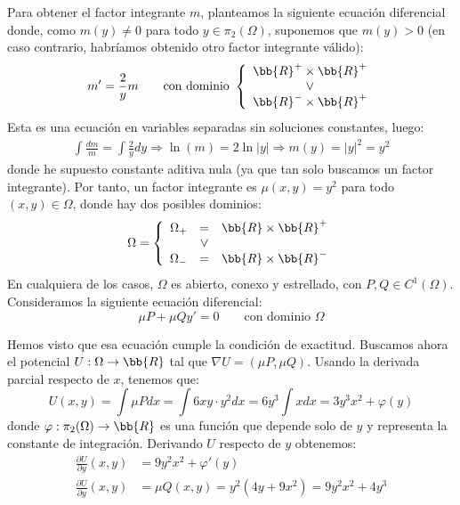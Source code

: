 \begin{ejercicio}
\begin{enumerate}
        Para obtener el factor integrante $m$, planteamos la siguiente ecuación diferencial donde, como $m(y)\neq 0$ para todo $y\in\pi_2(\Omega)$, suponemos que $m(y)>0$ (en caso contrario, habríamos obtenido otro factor integrante válido):
        \begin{equation*}
            m'=\frac{2}{y}m \qquad \text{con dominio }\left\{
                \begin{array}{c}
                    \bb{R}^+\times \bb{R}^+\\
                    \lor\\
                    \bb{R}^-\times \bb{R}^+
                \end{array}
            \right.
        \end{equation*}
        Esta es una ecuación en variables separadas sin soluciones constantes, luego:
        \begin{align*}
            \int \frac{dm}{m} = \int \frac{2}{y}dy
            \Longrightarrow \ln (m) = 2\ln |y|
            \Longrightarrow m(y) = |y|^2 = y^2
        \end{align*}
        donde he supuesto constante aditiva nula (ya que tan solo buscamos un factor integrante). Por tanto, un factor integrante es $\mu(x,y)=y^2$ para todo $(x,y)\in\Omega$, donde hay dos posibles dominios:
        \begin{equation*}
            \Omega=\left\{
                \begin{array}{rcl}
                    \Omega_+ &=& \bb{R} \times \bb{R}^+\\
                    &\lor&\\
                    \Omega_- &=& \bb{R} \times \bb{R}^-
                \end{array}
            \right.
        \end{equation*}
        En cualquiera de los casos, $\Omega$ es abierto, conexo y estrellado, con $P,Q\in C^1(\Omega)$. Consideramos la siguiente ecuación diferencial:
        \begin{equation*}
            \mu P + \mu Q y' = 0 \qquad \text{con dominio }\Omega
        \end{equation*}

        Hemos visto que esa ecuación cumple la condición de exactitud. Buscamos ahora el potencial $U:\Omega\to\bb{R}$ tal que $\nabla U=(\mu P,\mu Q)$. Usando la derivada parcial respecto de $x$, tenemos que:
        \begin{equation*}
            U(x,y)=\int \mu P dx = \int 6xy\cdot y^2 dx = 6y^3\int x dx = 3y^3x^2 +\varphi(y)
        \end{equation*}
        donde $\varphi:\pi_2(\Omega)\to\bb{R}$ es una función que depende solo de $y$ y representa la constante de integración. Derivando $U$ respecto de $y$ obtenemos:
        \begin{align*}
            \frac{\partial U}{\partial y}(x,y)&=9y^2x^2+\varphi'(y)\\
            \frac{\partial U}{\partial y}(x,y)&=\mu Q(x,y)=y^2(4y+9x^2)=9y^2x^2+4y^3
        \end{align*}


\end{enumerate}
\end{ejercicio}
